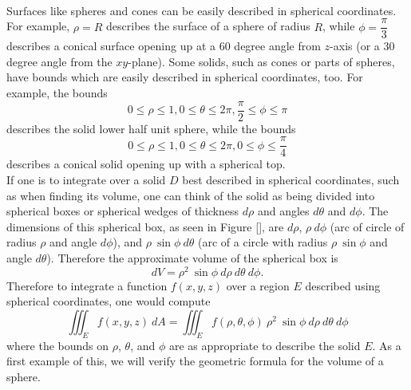  \\

Surfaces like spheres and cones can be easily described in spherical coordinates.  For example, $\rho = R$ describes the surface of a sphere of radius $R$, while $\phi = \dfrac{\pi}{3}$ describes a conical surface opening up at a $60$ degree angle from $z$-axis (or a $30$ degree angle from the $xy$-plane). Some solids, such as cones or parts of spheres, have bounds which are easily described in spherical coordinates, too.  For example, the bounds
$$0 \leq \rho \leq 1, 0 \leq \theta \leq 2\pi, \dfrac{\pi}{2} \leq \phi \leq \pi$$
describes the solid lower half unit sphere, while the bounds
$$0 \leq \rho \leq 1, 0 \leq \theta \leq 2\pi, 0 \leq \phi \leq \dfrac{\pi}{4}$$
describes a conical solid opening up with a spherical top.\\

If one is to integrate over a solid $D$ best described in spherical coordinates, such as when finding its volume, one can think of the solid as being divided into spherical boxes or spherical wedges of thickness $d\rho$ and angles $d\theta$ and $d\phi$.  The dimensions of this spherical box, as seen in Figure \ref{}, are $d\rho$, $\rho \: d\phi$ (arc of circle of radius $\rho$ and angle $d\phi$), and $\rho \: \sin\phi \: d\theta$ (arc of a circle with radius $\rho \: \sin\phi$ and angle $d\theta$). Therefore the approximate volume of the spherical box is
$$dV = \rho^2 \: \sin\phi \: d\rho \: d\theta \: d\phi.$$
Therefore to integrate a function $f(x,y,z)$ over a region $E$ described using spherical coordinates, one would compute
$$\iiint_E f(x,y,z) \: dA = \iiint_E f(\rho,\theta,\phi) \: \rho^2 \: \sin\phi \: d\rho \: d\theta \: d\phi$$
where the bounds on $\rho$, $\theta$, and $\phi$ are as appropriate to describe the solid $E$. As a first example of this, we will verify the geometric formula for the volume of a sphere.\\

